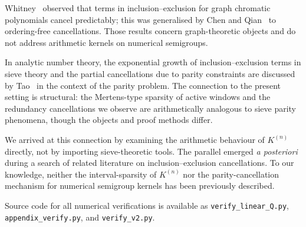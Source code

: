 \documentclass[11pt,a4paper]{amsart}
\theoremstyle{plain}
\theoremstyle{definition}
\theoremstyle{remark}
\begin{document}
Whitney~\cite{Whitney1932} observed that terms in inclusion--exclusion
for graph chromatic polynomials cancel predictably; this was generalised
by Chen and Qian~\cite{ChenQian2018} to ordering-free cancellations.
Those results concern graph-theoretic objects and do not address arithmetic
kernels on numerical semigroups.

In analytic number theory, the exponential growth of inclusion--exclusion
terms in sieve theory and the partial cancellations due to parity constraints
are discussed by Tao~\cite{Tao2007} in the context of the parity problem.
The connection to the present setting is structural: the Mertens-type
sparsity of active windows and the redundancy cancellations we observe
are arithmetically analogous to sieve parity phenomena, though the objects
and proof methods differ.

We arrived at this connection by examining the arithmetic behaviour of
$K^{(n)}$ directly, not by importing sieve-theoretic tools.
The parallel emerged \emph{a posteriori} during a search of related
literature on inclusion--exclusion cancellations. To our knowledge,
neither the interval-sparsity of $K^{(n)}$ nor the parity-cancellation
mechanism for numerical semigroup kernels has been previously described.

Source code for all numerical verifications is available as
\texttt{verify\_linear\_Q.py}, \texttt{appendix\_verify.py},
and \texttt{verify\_v2.py}.

\printbibliography
\end{document}
